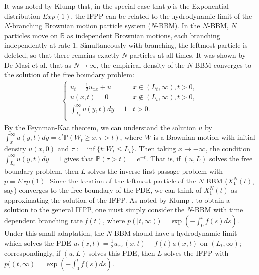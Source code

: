 \documentclass{article}
\newcommand{\B}[1]{\mathbb{#1}}
\begin{document}

It was noted by Klump \cite{ifptpAsHydroKlump} that, in the special case that $p$ is the Exponential distribution $Exp(1)$, the IFPP can be related to the hydrodynamic limit of the $N$-branching Brownian motion particle system ($N$-BBM). In the $N$-BBM, $N$ particles move on $\B{R}$ as independent Brownian motions, each branching independently at rate $1$. Simultaneously with branching, the leftmost particle is deleted, so that there remains exactly $N$ particles at all times. It was shown by De Masi et al. \cite{hydroNBBM} that as $N\to\infty$, the empirical density of the $N$-BBM converges to the solution of the free boundary problem:
\begin{align*}
\begin{cases}
    u_t=\frac{1}{2}u_{xx} + u  & x\in(L_t,\infty), t>0, \\
    u(x,t)=0 & x\notin (L_t,\infty), t>0, \\
    \int_{L_t}^\infty u(y,t)dy=1 & t>0. \\
\end{cases}
\end{align*}
By the Feynman-Kac theorem, we can understand the solution $u$ by $\int_x^\infty u(y,t)dy = e^t\B{P}(W_t\geq x, \tau>t)$, where $W$ is a Brownian motion with initial density $u(x,0)$ and $\tau:=\inf\{t:W_t\leq L_t\}$. Then taking $x\to -\infty$, the condition $\int_{L_t}^\infty u(y,t)dy=1$ gives that $\B{P}(\tau>t)=e^{-t}$. That is, if $(u,L)$ solves the free boundary problem, then $L$ solves the inverse first passage problem with $p=Exp(1)$. Since the location of the leftmost particle of the $N$-BBM ($X_1^N(t)$, say) converges to the free boundary of the PDE, we can think of $X_1^N(t)$ as approximating the solution of the IFPP. As noted by Klump \cite{ifptpAsHydroKlump}, to obtain a solution to the general IFPP, one must simply consider the $N$-BBM with time dependent branching rate $f(t)$, where $p([t,\infty))=\exp(-\int_0^t f(s)ds)$. Under this small adaptation, the $N$-BBM should have a hydrodynamic limit which solves the PDE $u_t(x,t)= \frac12u_{xx}(x,t)+f(t)u(x,t)$
on $(L_t,\infty)$; correspondingly, if $(u,L)$ solves this PDE, then $L$ solves the IFPP with $p((t,\infty)=\exp(-\int_0^t f(s)ds)$. 
\end{document}
